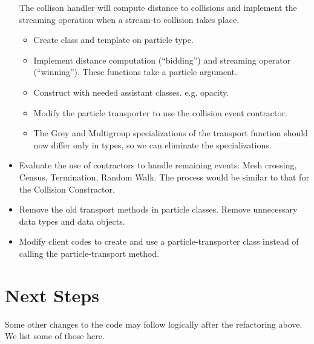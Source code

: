 \documentclass[memo]{ResearchNote}
\begin{document}
\begin{itemize}
  The collison handler will compute distance to collisions and
  implement the streaming operation when a stream-to collision
  takes place. 

  \begin{itemize}
    \item Create class and template on particle type.
    \item Implement distance computation (``bidding'') and streaming
      operator (``winning''). These functions take a particle
      argument.
    \item Construct with needed assistant classes. e.g. opacity.
    \item Modify the particle transporter to use the collision event
      contractor.
    \item The Grey and Multigroup specializations of the transport
      function should now differ only in types, so we can eliminate
      the specializations.
    \end{itemize}
    
  \item Evaluate the use of contractors to handle remaining events:
    Mesh crossing, Census, Termination, Random Walk. The process would
    be similar to that for the Collision Constractor.
    
  \item Remove the old transport methods in particle classes. Remove
    unnecessary data types and data objects.
    
  \item Modify client codes to create and use a particle-transporter
    class instead of calling the particle-transport method.

\end{itemize}

\section{Next Steps}

Some other changes to the code may follow logically after the
refactoring above. We list some of those here.
\end{document}

